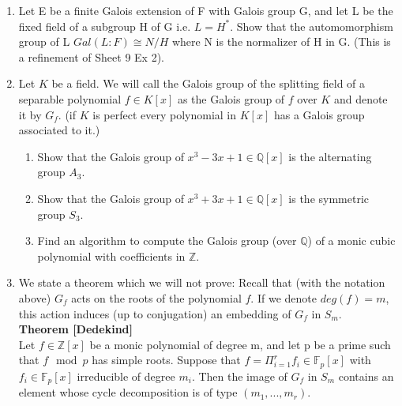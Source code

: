 \documentclass[12pt,a4paper]{article}
\begin{document}
 
\noindent


\begin{enumerate}
\item 
Let E be a finite Galois extension of F with Galois group G, and let L be the fixed field of a subgroup H of G i.e. $L=H^*$. Show that the automomorphism group of L $Gal(L:F) \cong N/H$ where N is the normalizer of H in G. (This is a refinement of Sheet 9 Ex 2).

\item 
Let $K$ be a field. We will call the Galois group of the splitting field of a separable polynomial $f\in K[x]$ as the Galois group of $f$ over $K$ and denote it by $G_f$. (if $K$ is perfect every polynomial in $K[x]$ has a Galois group associated to it.)
\begin{enumerate}
    \item Show that the Galois group of $x^3-3x+1\in\mathbb{Q}[x]$ is the alternating group $A_3$.
    \item Show that the Galois group of $x^3+3x+1\in\mathbb{Q}[x]$ is the symmetric group $S_3$.
    \item Find an algorithm to compute the Galois group (over $\mathbb{Q}$) of a monic cubic polynomial with coefficients in $\mathbb{Z}$. 
\end{enumerate}{}

\item 
We state a theorem which we will not prove: Recall that (with the notation above) $G_f$ acts on the roots of the polynomial $f$. If we denote $deg(f)=m$, this action induces (up to conjugation) an embedding of $G_f$ in $S_m$.\\

\textbf{Theorem [Dedekind]}\\

Let $f\in\mathbb{Z}[x]$ be a monic polynomial of degree m, and let p be a prime such that $f \mod p$ has simple roots. Suppose that $f=\Pi_{i=1}^{r} f_i \in \mathbb{F}_p[x]$ with $f_i\in\mathbb{F}_p[x]$ irreducible of degree $m_i$. Then the image of $G_f$ in $S_m$ contains an element whose cycle decomposition is of type $(m_1,...,m_r)$.\\


\end{enumerate}
\end{document}
